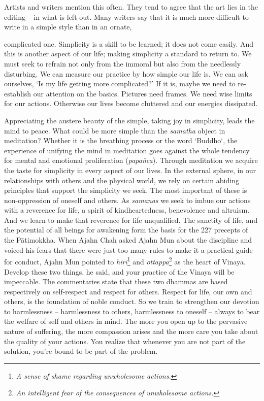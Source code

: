 Artists and writers mention this often. They tend to agree that the art
lies in the editing -- in what is left out. Many writers say that it is
much more difficult to write in a simple style than in an ornate,

complicated one. Simplicity is a skill to be learned; it does not come
easily. And this is another aspect of our life; making simplicity a
standard to return to. We must seek to refrain not only from the immoral
but also from the needlessly disturbing. We can measure our practice by
how simple our life is. We can ask ourselves, `Is my life getting more
complicated?' If it is, maybe we need to re-establish our attention on
the basics. Pictures need frames. We need wise limits for our actions.
Otherwise our lives become cluttered and our energies dissipated.

Appreciating the austere beauty of the simple, taking joy in simplicity,
leads the mind to peace. What could be more simple than the
\emph{samatha} object in meditation? Whether it is the breathing process
or the word `Buddho`, the experience of unifying the mind in meditation
goes against the whole tendency for mental and emotional proliferation
(\emph{papañca}). Through meditation we acquire the taste for simplicity
in every aspect of our lives. In the external sphere, in our
relationships with others and the physical world, we rely on certain
abiding principles that support the simplicity we seek. The most
important of these is non-oppression of oneself and others. As
\emph{samanas} we seek to imbue our actions with a reverence for life, a
spirit of kindheartedness, benevolence and altruism. And we learn to
make that reverence for life unqualified. The sanctity of life, and the
potential of all beings for awakening form the basis for the 227
precepts of the Pātimokkha. When Ajahn Chah asked Ajahn Mun about the
discipline and voiced his fears that there were just too many rules to
make it a practical guide for conduct, Ajahn Mun pointed to
\emph{hiri}\footnote{\emph{A sense of shame regarding unwholesome
  actions.}} and \emph{ottappa}\footnote{\emph{An intelligent fear of
  the consequences of unwholesome actions.}} as the heart of Vinaya.
Develop these two things, he said, and your practice of the Vinaya will
be impeccable. The commentaries state that these two dhammas are based
respectively on self-respect and respect for others. Respect for life,
our own and others, is the foundation of noble conduct. So we train to
strengthen our devotion to harmlessness -- harmlessness to others,
harmlessness to oneself -- always to bear the welfare of self and
others in mind. The more you open up to the pervasive nature of
suffering, the more compassion arises and the more care you take about
the quality of your actions. You realize that whenever you are not part
of the solution, you're bound to be part of the problem.

